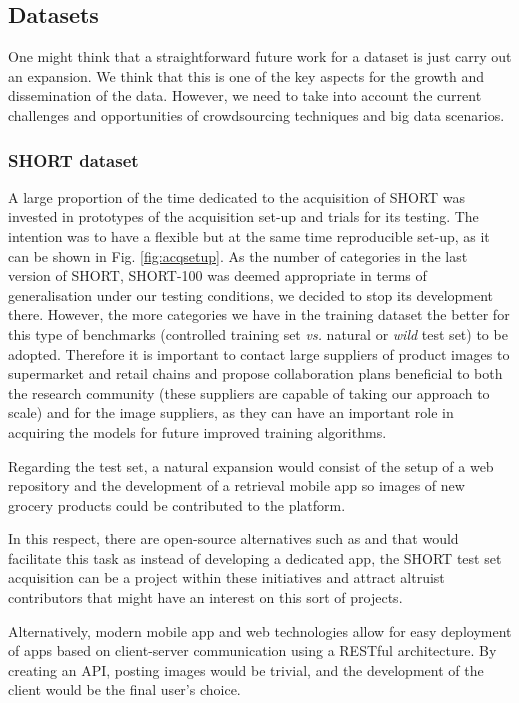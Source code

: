 \subsection{Datasets}

One might think that a straightforward future work for a dataset is just carry out an expansion. We think that this is one of the key aspects for the growth and dissemination of the data. However, we need to take into account the current challenges and opportunities of crowdsourcing techniques and big data scenarios.

\subsubsection{SHORT dataset}

A large proportion of the time dedicated to the acquisition of SHORT was invested in prototypes of the acquisition set-up and trials for its testing. The intention was to have a flexible but at the same time reproducible set-up, as it can be shown in Fig. \ref{fig:acqsetup}. As the number of categories in the last version of SHORT, SHORT-100 was deemed appropriate in terms of generalisation under our testing conditions, we decided to stop its development there. However, the more categories we have in the training dataset the better for this type of benchmarks (controlled training set \textit{vs.} natural or \textit{wild} test set) to be adopted. Therefore it is important to contact large suppliers of product images to supermarket and retail chains and propose collaboration plans beneficial to both the research community (these suppliers are capable of taking our approach to scale) and for the image suppliers, as they can have an important role in acquiring the models for future improved training algorithms.

Regarding the test set, a natural expansion would consist of the setup of a web repository and the development of a retrieval mobile app so images of new grocery products could be contributed to the platform.

In this respect, there are open-source alternatives such as \cite{apple} and \cite{google} that would facilitate this task as instead of developing a dedicated app, the SHORT test set acquisition can be a project within these initiatives and attract altruist contributors that might have an interest on this sort of projects.

Alternatively, modern mobile app and web technologies allow for easy deployment of apps based on client-server communication using a RESTful architecture. By creating an API, posting images would be trivial, and the development of the client would be the final user's choice.

